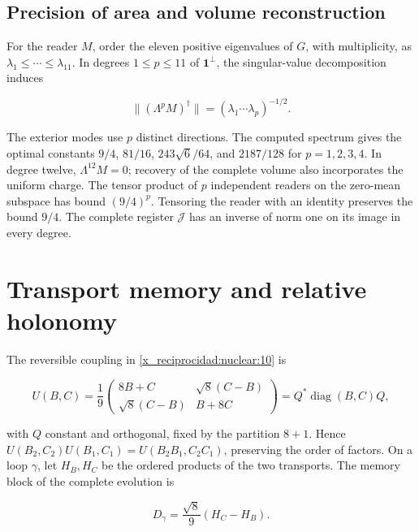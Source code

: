 \subsection{Precision of area and volume reconstruction}

For the reader \(M\), order the eleven positive eigenvalues of \(G\), with multiplicity, as \(\lambda_1\le\cdots\le\lambda_{11}\). In degrees \(1\le p\le11\) of \(\mathbf1^\perp\), the singular-value decomposition induces



\begin{equation}
\|(\Lambda^pM)^\dagger\|
=(\lambda_1\cdots\lambda_p)^{-1/2}.
\label{x_reciprocidad:nuc11:eq:24}
\end{equation}



The exterior modes use \(p\) distinct directions. The computed spectrum gives the optimal constants \(9/4\), \(81/16\), \(243\sqrt6/64\), and \(2187/128\) for \(p=1,2,3,4\). In degree twelve, \(\Lambda^{12}M=0\); recovery of the complete volume also incorporates the uniform charge. The tensor product of \(p\) independent readers on the zero-mean subspace has bound \((9/4)^p\). Tensoring the reader with an identity preserves the bound \(9/4\). The complete register \(\mathcal J\) has an inverse of norm one on its image in every degree.

\section{Transport memory and relative holonomy}

The reversible coupling in \cref{x_reciprocidad:nuclear:10} is



\[
U(B,C)=\frac19
\begin{pmatrix}8B+C&\sqrt8(C-B)\\
\sqrt8(C-B)&B+8C\end{pmatrix}
=Q^*\operatorname{diag}(B,C)Q,
\]



with \(Q\) constant and orthogonal, fixed by the partition \(8+1\). Hence \(U(B_2,C_2)U(B_1,C_1)=U(B_2B_1,C_2C_1)\), preserving the order of factors. On a loop \(\gamma\), let \(H_B,H_C\) be the ordered products of the two transports. The memory block of the complete evolution is



\[
D_\gamma=\frac{\sqrt8}{9}(H_C-H_B).
\]



